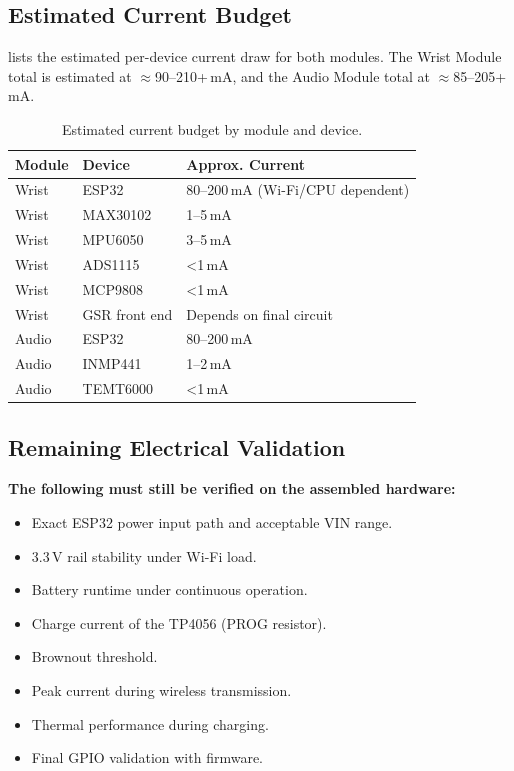 \subsection{Estimated Current Budget}
\label{sec:current-budget}

 lists the estimated per-device current draw for both modules. The Wrist Module total is estimated at $\approx$90--210+\,mA, and the Audio Module total at $\approx$85--205+\,mA.

\begin{table}[H]
\centering
\caption{Estimated current budget by module and device.}
\label{tab:current-budget}
\small
\begin{tabularx}{\columnwidth}{@{}l l Y@{}}
\toprule
\textbf{Module} & \textbf{Device} & \textbf{Approx. Current} \\
\midrule
Wrist & ESP32 & 80--200\,mA (Wi-Fi/CPU dependent) \\
Wrist & MAX30102 & 1--5\,mA \\
Wrist & MPU6050 & 3--5\,mA \\
Wrist & ADS1115 & \textless 1\,mA \\
Wrist & MCP9808 & \textless 1\,mA \\
Wrist & GSR front end & Depends on final circuit \\
\midrule
Audio & ESP32 & 80--200\,mA \\
Audio & INMP441 & 1--2\,mA \\
Audio & TEMT6000 & \textless 1\,mA \\
\bottomrule
\end{tabularx}
\end{table}

\subsection{Remaining Electrical Validation}
\label{sec:remaining-electrical-validation}

\begin{requirementbox}
\textbf{The following must still be verified on the assembled hardware:}
\begin{itemize}
    \item Exact ESP32 power input path and acceptable VIN range.
    \item 3.3\,V rail stability under Wi-Fi load.
    \item Battery runtime under continuous operation.
    \item Charge current of the TP4056 (PROG resistor).
    \item Brownout threshold.
    \item Peak current during wireless transmission.
    \item Thermal performance during charging.
    \item Final GPIO validation with firmware.
\end{itemize}
\end{requirementbox}

